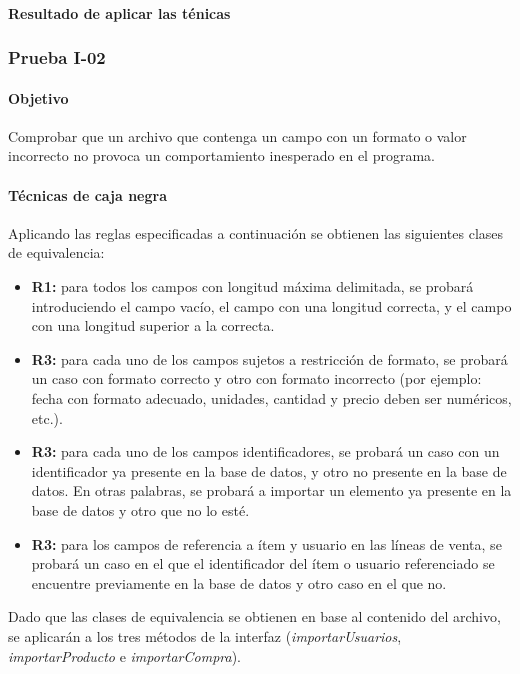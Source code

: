 \documentclass[10pt,a4paper]{article}
\begin{document}
			\paragraph{Resultado de aplicar las ténicas}
			\subsubsection{Prueba I-02}
			\paragraph{Objetivo} Comprobar que un archivo que contenga un campo con un formato o valor incorrecto no provoca un comportamiento inesperado en el programa.
			\paragraph{Técnicas de caja negra} Aplicando las reglas especificadas a continuación se obtienen las siguientes clases de equivalencia:
			\begin{itemize}
				\item \textbf{R1:} para todos los campos con longitud máxima delimitada, se probará introduciendo el campo vacío, el campo con una longitud correcta, y el campo con una longitud superior a la correcta.
				\item \textbf{R3:} para cada uno de los campos sujetos a restricción de formato, se probará un caso con formato correcto y otro con formato incorrecto (por ejemplo: fecha con formato adecuado, unidades, cantidad y precio deben ser numéricos, etc.).
				\item \textbf{R3:} para cada uno de los campos identificadores, se probará un caso con un identificador ya presente en la base de datos, y otro no presente en la base de datos. En otras palabras, se probará a importar un elemento ya presente en la base de datos y otro que no lo esté.
				\item \textbf{R3:} para los campos de referencia a ítem y usuario en las líneas de venta, se probará un caso en el que el identificador del ítem o usuario referenciado se encuentre previamente en la base de datos y otro caso en el que no.
			\end{itemize}
			Dado que las clases de equivalencia se obtienen en base al contenido del archivo, se aplicarán a los tres métodos de la interfaz  (\textit{importarUsuarios}, \textit{importarProducto} e \textit{importarCompra}).
			
\end{document}
